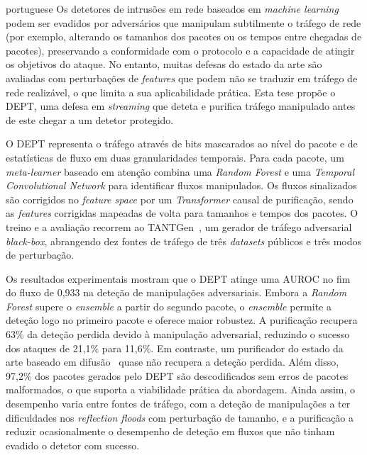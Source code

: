 \acresetall
\begin{otherlanguage*}{portuguese}
\noindent Os detetores de intrusões em rede baseados em \textit{machine learning} podem ser evadidos por adversários que manipulam subtilmente o tráfego de rede (por exemplo, alterando os tamanhos dos pacotes ou os tempos entre chegadas de pacotes), preservando a conformidade com o protocolo e a capacidade de atingir os objetivos do ataque.
No entanto, muitas defesas do estado da arte são avaliadas com perturbações de \textit{features} que podem não se traduzir em tráfego de rede realizável, o que limita a sua aplicabilidade prática.
Esta tese propõe o DEPT, uma defesa em \textit{streaming} que deteta e purifica tráfego manipulado antes de este chegar a um detetor protegido.

O DEPT representa o tráfego através de bits mascarados ao nível do pacote e de estatísticas de fluxo em duas granularidades temporais.
Para cada pacote, um \textit{meta-learner} baseado em atenção combina uma \textit{Random Forest} e uma \textit{Temporal Convolutional Network} para identificar fluxos manipulados.
Os fluxos sinalizados são corrigidos no \textit{feature space} por um \textit{Transformer} causal de purificação, sendo as \textit{features} corrigidas mapeadas de volta para tamanhos e tempos dos pacotes.
O treino e a avaliação recorrem ao TANTGen~\cite{pissarra2026tantgen}, um gerador de tráfego adversarial \textit{black-box}, abrangendo dez fontes de tráfego de três \textit{datasets} públicos e três modos de perturbação.

Os resultados experimentais mostram que o DEPT atinge uma \mbox{AUROC} no fim do fluxo de 0,933 na deteção de manipulações adversariais.
Embora a \textit{Random Forest} supere o \textit{ensemble} a partir do segundo pacote, o \textit{ensemble} permite a deteção logo no primeiro pacote e oferece maior robustez.
A purificação recupera 63\% da deteção perdida devido à manipulação adversarial, reduzindo o sucesso dos ataques de 21,1\% para 11,6\%.
Em contraste, um purificador do estado da arte baseado em difusão~\cite{merzouk2024diffusion} quase não recupera a deteção perdida.
Além disso, 97,2\% dos pacotes gerados pelo DEPT são descodificados sem erros de pacotes malformados, o que suporta a viabilidade prática da abordagem.
Ainda assim, o desempenho varia entre fontes de tráfego, com a deteção de manipulações a ter dificuldades nos \textit{reflection floods} com perturbação de tamanho, e a purificação a reduzir ocasionalmente o desempenho de deteção em fluxos que não tinham evadido o detetor com sucesso.
\end{otherlanguage*}
